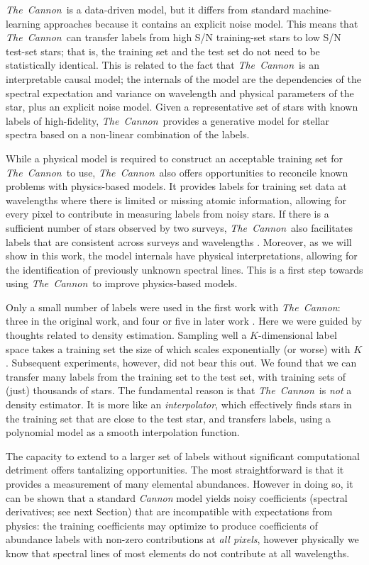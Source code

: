 \documentclass[12pt,preprint]{aastex}
\newcommand{\project}[1]{\textsl{#1}}
\newcommand{\TheCannon}{\project{The~Cannon}}
\begin{document}
  \TheCannon\ is a data-driven model, 
but it differs from standard machine-learning approaches because it contains an 
explicit noise model.  This means that \TheCannon\ can transfer labels from high
S/N training-set stars to low S/N test-set stars; that is, the training set and
the test set do not need to be statistically identical.  This is related to the
fact that \TheCannon\ is an interpretable causal model; the internals of the model are 
the dependencies of the spectral expectation and variance on wavelength and 
physical parameters of the star, plus an explicit noise model.  Given a representative set of stars with known
labels of high-fidelity, \TheCannon\ provides a generative model for stellar 
spectra based on a non-linear combination of the labels.  



While a physical model is required to construct an acceptable training set for
\TheCannon\ to use, \TheCannon\ also offers opportunities to reconcile known problems with physics-based 
models.  It provides labels for training set data at wavelengths where there is
limited or missing atomic information, allowing for every pixel to contribute in 
measuring labels from noisy stars.  If there is a sufficient
number of stars observed by two surveys, \TheCannon\ also facilitates labels that
are consistent across surveys and wavelengths \citep{Ho_2016}.  Moreover, as we
will show in this work, the model internals have physical interpretations, 
allowing for the identification of previously unknown spectral lines.  This is
a first step towards using \TheCannon\ to improve physics-based models.


Only a small number of labels were used in the first work with \TheCannon: 
three in the original work, and four or five in later work \citep{tc, age, Ho_2016}. 
Here we were guided by thoughts related to density estimation. Sampling well a 
$K$-dimensional label space takes a training set the size of which scales 
exponentially (or worse) with $K$.  Subsequent experiments, however, did not 
bear this out.  We found that we can transfer many labels from the training set 
to the test set, with training sets of (just) thousands of stars.  The fundamental 
reason is that \TheCannon\ is \emph{not} a density estimator.  It is more like 
an \emph{interpolator}, which effectively finds stars in the training set that
are close to the test star, and transfers labels, using a polynomial 
model as a smooth interpolation function.


The capacity to extend to a larger set of labels without significant
computational detriment offers tantalizing opportunities.  The most 
straightforward is that it provides a measurement of many elemental abundances.
However in doing so, it can be shown that a standard \emph{Cannon} model yields
noisy coefficients (spectral derivatives; see next Section) that are incompatible with 
expectations from physics: the training coefficients may optimize to produce 
coefficients of abundance labels with non-zero 
contributions at \emph{all pixels}, however physically we know that spectral lines of most
elements do not contribute at all wavelengths. 
\end{document}
